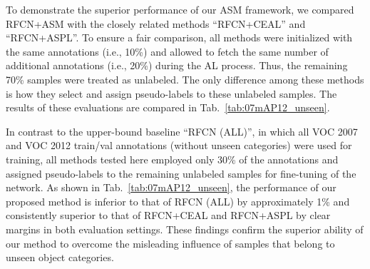 \documentclass[journal]{IEEEtran}
\begin{document}
{To demonstrate the superior performance of our ASM framework, we compared RFCN+{ASM} with the closely related methods ``RFCN+CEAL'' and ``RFCN+ASPL''. To ensure a fair comparison, all methods were initialized with the same annotations (i.e., 10\%) and allowed to fetch the same number of additional annotations (i.e., 20\%) during the AL process. Thus, the remaining 70\% samples were treated as unlabeled. The only difference among these methods is how they select and assign pseudo-labels to these unlabeled samples. The results of these evaluations are compared in Tab.~\ref{tab:07mAP12_unseen}. 

In contrast to the upper-bound baseline ``RFCN (ALL)'', in which all VOC 2007 and VOC 2012 train/val annotations (without unseen categories) were used for training, all methods tested here employed only 30\% of the annotations and assigned pseudo-labels to the remaining unlabeled samples for fine-tuning of the network. As shown in Tab.~\ref{tab:07mAP12_unseen}, the performance of our proposed method is inferior to that of RFCN (ALL) by approximately 1\% and consistently superior to that of RFCN+CEAL and RFCN+ASPL by clear margins in both evaluation settings. These findings confirm the superior ability of our method to overcome the misleading influence of samples that belong to unseen object categories.   



}
\end{document}
